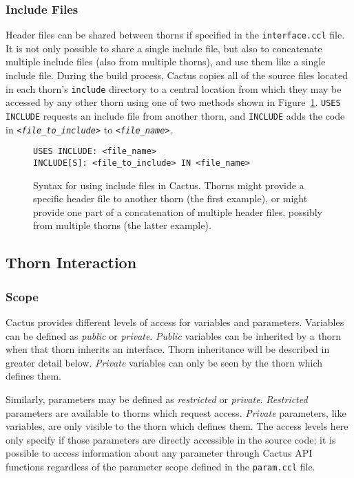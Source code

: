 \documentclass[conference]{IEEEtran}
\begin{document}
\subsubsection{Include Files}
\label{includes}
Header files can be shared between thorns if specified in the \texttt{interface.ccl} file. It is
not only possible to share a single include file, but also to concatenate multiple include
files (also from multiple thorns), and use them like a single include file.
During the build process, Cactus copies all of the source files located in each 
thorn's \texttt{include} directory to a central location from which they may be accessed by any
other thorn using one of two methods shown in Figure~\ref{cactusinclude}. \texttt{USES INCLUDE} requests
an include file from another thorn, and 
\texttt{INCLUDE} adds the code in \texttt{\emph{<file\_to\_include>}}
to \texttt{\emph{<file\_name>}}.

\begin{figure}[h]
\centering
{\small
\begin{Verbatim}[frame=single, framerule=0.3mm]
USES INCLUDE: <file_name>
INCLUDE[S]: <file_to_include> IN <file_name>
\end{Verbatim}
}
\caption{Syntax for using include files in Cactus. Thorns might provide a specific header file
to another thorn (the first example), or might provide one part of a concatenation of multiple header files, possibly from multiple thorns (the latter example).}
\label{cactusinclude}
\end{figure}

\subsection{Thorn Interaction}
\subsubsection{Scope}
Cactus provides different levels of access for variables and parameters. 
Variables can be defined as \emph{public} or \emph{private}.
\emph{Public} variables can be inherited by a thorn when that thorn inherits an interface. 
Thorn inheritance will be described in greater detail below. 
\emph{Private} variables can only be seen by the thorn which defines them.


Similarly, parameters may be defined as \emph{restricted} or \emph{private}.
\emph{Restricted} parameters are available to thorns which request access.
\emph{Private} parameters, like variables, are only visible to the thorn which defines them.
The
access levels here only specify if those parameters are directly accessible in the source code; it is possible to access information about any parameter through Cactus API functions regardless of 
the parameter scope defined in the {\tt param.ccl} file. 
\end{document}
